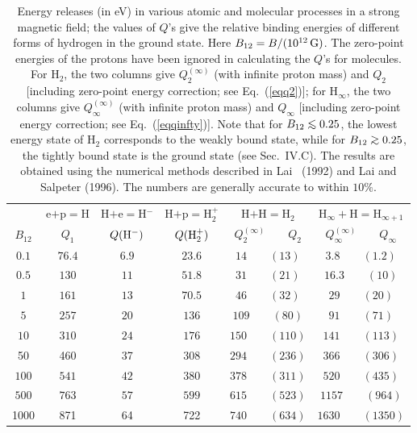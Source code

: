 \begin{table}
\caption{Energy releases (in eV) in various atomic and 
molecular processes in a strong magnetic field; the values of
$Q$'s give the relative binding energies of different forms
of hydrogen in the ground state. 
Here $B_{12}=B/(10^{12}\,{\rm G})$. The zero-point
energies of the protons have been ignored in calculating
the $Q$'s for molecules. For H$_2$, the two columns give
$Q_2^{(\infty)}$ (with infinite proton mass) and $Q_2$ 
[including zero-point energy correction; see Eq.~(\ref{eqq2})];
for H$_\infty$, the two columns give $Q_\infty^{(\infty)}$ (with
infinite proton mass) and $Q_\infty$ [including zero-point 
energy correction; see Eq.~(\ref{eqqinfty})]. Note that for $B_{12}\lo 0.25$,
the lowest energy state of H$_2$ corresponds to the weakly bound state, while
for $B_{12}\go 0.25$, the tightly bound state is the ground state (see 
Sec.~IV.C). The results are
obtained using the numerical methods described in Lai \etal~(1992) and Lai
and Salpeter (1996). The numbers are generally accurate to within $10\%$.}
\begin{tabular}{c c c c c c}
  & e$+$p$=$H&H$+$e$=$H$^-$&H$+$p$=$H$_2^+$&H$+$H$=$H$_2$
& H$_{\infty}+$H$=$H$_{\infty+1}$\\ 
$B_{12}$ & $Q_1$ & $Q({\rm H}^-)$ & $Q({\rm H}_2^+)$ & $Q_2^{(\infty)}\qquad
Q_2$ & $Q_\infty^{(\infty)}\qquad Q_\infty$ \\
\hline
$0.1$ & $76.4$&$6.9$&$23.6$&$14\qquad (13)$ & $3.8\qquad (1.2)$\\
$0.5$ & $130$&$11$&$51.8$&$31\qquad (21)$  & $16.3\qquad (10)$\\
$1$ &  $161$&$13$&$70.5$&$46\qquad (32)$   & $29\qquad (20)$\\
$5$ &  $257$&$20$&$136$&$109\qquad (80)$     & $91\qquad (71)$\\
$10$& $310$&$24$&$176$&$150\qquad (110)$      & $141\qquad (113)$\\
50  & 460 & 37  & 308 & $294\qquad (236)$  & $366\qquad (306)$\\
$100$ & $541$&$42$&$380$&$378\qquad (311)$    & $520\qquad (435)$\\
$500$& $763$&$57$&$599$&$615\qquad (523)$     & $1157\qquad (964)$\\
1000 & 871  & 64 & 722 &  $740\qquad (634)$ & $1630\qquad (1350)$\\ 
\end{tabular}
\end{table}


